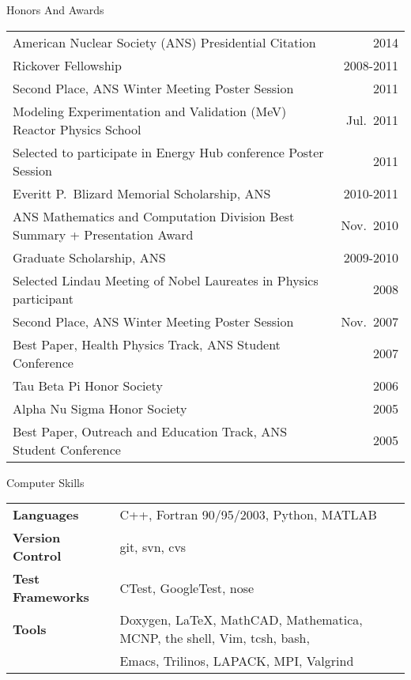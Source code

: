 \documentclass{resume2} %
\begin{document}
\vspace*{1em}
\begin{rSection}{Honors And Awards}

\begin{tabular}{ @{} l @{\hspace{6ex}} r }
American Nuclear Society (ANS) Presidential Citation & 2014 \\
Rickover Fellowship 	& 2008-2011 \\
Second Place, ANS Winter Meeting Poster Session	&2011\\
Modeling Experimentation and Validation (MeV) Reactor Physics School	& Jul.\ 2011\\
Selected to participate in Energy Hub conference Poster Session	&2011\\
Everitt P.\ Blizard Memorial Scholarship, ANS	&2010-2011\\
ANS Mathematics and Computation Division Best Summary + Presentation Award  &Nov.\ 2010\\
Graduate Scholarship, ANS 	&2009-2010\\
Selected Lindau Meeting of Nobel Laureates in Physics participant &	2008\\
Second Place, ANS Winter Meeting Poster Session	&Nov.\ 2007\\
Best Paper, Health Physics Track, ANS Student Conference 	&2007\\
Tau Beta Pi Honor Society	&2006\\
Alpha Nu Sigma Honor Society 	&2005 \\
Best Paper, Outreach and Education Track, ANS Student Conference	&2005
\end{tabular}

\end{rSection}


\begin{rSection}{Computer Skills}

\begin{tabular}{ @{} >{\bfseries}l @{\hspace{6ex}} l }
Languages & C++, Fortran 90/95/2003, Python, MATLAB \\
Version Control & git, svn, cvs \\
Test Frameworks & CTest, GoogleTest, nose \\
Tools & Doxygen, \LaTeX, MathCAD, Mathematica, MCNP, the shell, Vim, tcsh, bash, \\&Emacs, Trilinos, LAPACK, MPI, Valgrind
\end{tabular}

\end{rSection}
\end{document}
